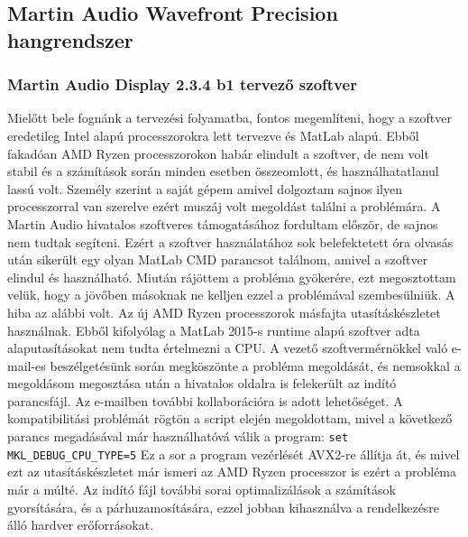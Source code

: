 \subsection{Martin Audio Wavefront Precision hangrendszer}
\subsubsection{Martin Audio Display 2.3.4 b1 tervező szoftver \cite{DISPLAY23USERGUIDE}}
Mielőtt bele fognánk a tervezési folyamatba, fontos megemlíteni, hogy a szoftver
eredetileg Intel alapú processzorokra lett tervezve és MatLab alapú. Ebből fakadóan
AMD Ryzen processzorokon habár elindult a szoftver, de nem volt stabil és a számítások során
minden esetben összeomlott, és használhatatlanul lassú volt. Személy szerint a saját gépem amivel dolgoztam
sajnos ilyen processzorral van szerelve ezért muszáj volt megoldást találni a problémára.
A Martin Audio hivatalos szoftveres támogatásához fordultam először, de sajnos nem tudtak segíteni.
Ezért a szoftver használatához
sok belefektetett óra olvasás után sikerült egy olyan MatLab CMD parancsot találnom, amivel
a szoftver elindul és használható.
Miután rájöttem a probléma gyökerére, ezt megosztottam velük, hogy a jövőben másoknak ne kelljen
ezzel a problémával szembesülniük.
A hiba az alábbi volt. Az új AMD Ryzen processzorok másfajta utasításkészletet használnak.
Ebből kifolyólag a MatLab 2015-s runtime alapú szoftver adta alaputasításokat nem tudta értelmezni a CPU.
A vezető szoftvermérnökkel való e-mail-es beszélgetésünk során megköszönte a probléma
megoldását, és nemsokkal a megoldásom megosztása után a hivatalos oldalra is felekerült
az indító parancsfájl. Az e-mailben további kollaborációra is adott lehetőséget.
A kompatibilitási problémát rögtön a script elején megoldottam,
mivel a következő parancs megadásával már használhatóvá válik a program: \texttt{set MKL\_DEBUG\_CPU\_TYPE=5} \newline
Ez a sor a program vezérlését AVX2-re állítja át, és mivel ezt az utasításkészletet már ismeri az AMD Ryzen processzor
is ezért a probléma már a múlté.
Az indító fájl további sorai optimalizálások a számítások gyorsítására, és a párhuzamosítására, ezzel jobban kihasználva
a rendelkezésre álló hardver erőforrásokat.
